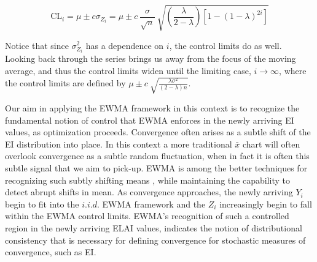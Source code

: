 \documentclass{article}
\begin{document}
%
%
\begin{equation}
\text{CL}_i = \mu \pm c \sigma_{Z_i}
=  \mu \pm c ~ \frac{\sigma}{\sqrt{n}}~\sqrt{\left(\frac{\lambda}{2-\lambda}\right)\left[1-(1-\lambda)^{2i}\right]}
\label{EWMACL}
\end{equation}
%
%

%
Notice that since $\sigma^2_{Z_i}$ has a dependence on $i$, the control limits do as well.
Looking back through the series brings us away from the focus of the moving average, %
and thus the control limits widen until the limiting case, $i\rightarrow\infty$, 
where the control limits are defined by $\mu \pm c ~ \sqrt{\frac{\lambda\sigma^2}{(2-\lambda)n}}$.

%
Our aim in applying the EWMA framework in this context is to recognize the 
fundamental notion of control that EWMA enforces in the newly arriving EI 
values, as optimization proceeds. Convergence often arises as a subtle shift 
of the EI distribution into place. In this context a more traditional $\bar x$ 
chart will often overlook convergence as a subtle random fluctuation, when in 
fact it is often this subtle signal that we aim to pick-up. EWMA is among the 
better techniques for recognizing such subtly shifting means \citep{aerne1991trend,zou2009compare}, 
while maintaining the capability to detect abrupt shifts in mean. As 
convergence approaches, the newly arriving $Y_i$ begin to fit into the $i.i.d.$ 
EWMA framework and the $Z_i$ increasingly begin to fall within the EWMA 
control limits. EWMA's recognition of such a controlled region in the newly 
arriving ELAI values, indicates the notion of distributional consistency that 
is necessary for defining convergence for stochastic measures of convergence, 
such as EI. 



\end{document}
